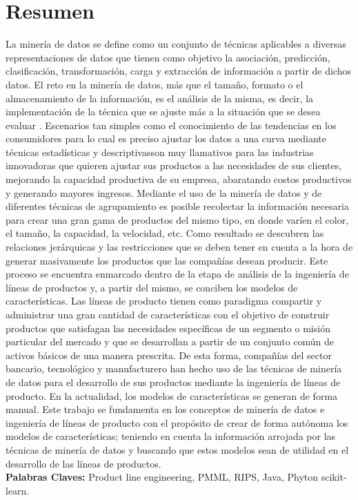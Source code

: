 \chapter{Resumen}

La minería de datos se define como un conjunto de técnicas aplicables a diversas representaciones de datos que tienen como objetivo la asociación, predicción, clasificación, transformación, carga y extracción de información a partir de dichos datos. El reto en la minería de datos, más que el tamaño, formato o el almacenamiento de la información, es el análisis de la misma, es decir, la implementación de la técnica que se ajuste más a la situación que se desea evaluar \cite{Izenman2006}. Escenarios tan simples como el conocimiento de las tendencias en los consumidores \textemdash	para lo cual es preciso ajustar los datos a una curva mediante técnicas estadísticas y descriptivas\textemdash son muy llamativos para las industrias innovadoras que quieren ajustar sus productos a las necesidades de sus clientes, mejorando la capacidad productiva de su empresa, abaratando costos productivos y generando mayores ingresos.
Mediante el uso de la minería de datos y de diferentes técnicas de agrupamiento es posible recolectar la información necesaria para crear una gran gama de productos del mismo tipo, en donde varíen el color, el tamaño, la capacidad, la velocidad, etc. Como resultado se descubren las relaciones jerárquicas y las restricciones que se deben tener en cuenta a la hora de generar masivamente los productos que las compañías desean producir. Este proceso se encuentra enmarcado dentro de la etapa de análisis de la ingeniería de líneas de productos y, a partir del mismo, se conciben los modelos de características. Las líneas de producto tienen como paradigma compartir y administrar una gran cantidad de características con el objetivo de construir productos que satisfagan las necesidades específicas de un segmento o misión particular del mercado y que se desarrollan a partir de un conjunto común de activos básicos de una manera prescrita. De esta forma, compañías del sector bancario\cite{Koutanaei2015}, tecnológico \cite{Lin2013} y manufacturero \cite{Bae2011} han hecho uso de las técnicas de minería de datos para el desarrollo de sus productos mediante la ingeniería de líneas de producto. 
En la actualidad, los modelos de características se generan de forma manual. Este trabajo se fundamenta en los conceptos de minería de datos e ingeniería de líneas de producto con el propósito de crear de forma autónoma los modelos de características; teniendo en cuenta la información arrojada por las técnicas de minería de datos y buscando que estos modelos sean de utilidad en el desarrollo de las líneas de productos.
\\
\textbf{Palabras Claves:}
Product line engineering, PMML, RIPS, Java, Phyton scikit-learn. 

